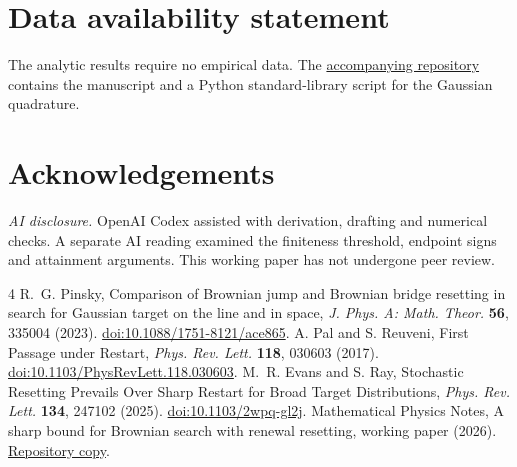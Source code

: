 \documentclass[11pt]{article}
\begin{document}
\section*{Data availability statement}
The analytic results require no empirical data. The
\href{https://github.com/daemonx666/math-physics-notes/tree/main/papers/gaussian-periodic-resetting}{accompanying repository}
contains the manuscript and a Python standard-library script for the
Gaussian quadrature.

\section*{Acknowledgements}
\emph{AI disclosure.} OpenAI Codex assisted with derivation, drafting and
numerical checks. A separate AI reading examined the finiteness threshold,
endpoint signs and attainment arguments. This working paper has not
undergone peer review.

\begin{thebibliography}{4}
 R.~G. Pinsky, Comparison of Brownian jump and Brownian
bridge resetting in search for Gaussian target on the line and in space,
\emph{J. Phys. A: Math. Theor.} \textbf{56}, 335004 (2023).
\href{https://doi.org/10.1088/1751-8121/ace865}{doi:10.1088/1751-8121/ace865}.
 A. Pal and S. Reuveni, First Passage under Restart,
\emph{Phys. Rev. Lett.} \textbf{118}, 030603 (2017).
\href{https://doi.org/10.1103/PhysRevLett.118.030603}{doi:10.1103/PhysRevLett.118.030603}.
 M.~R. Evans and S. Ray, Stochastic Resetting Prevails Over
Sharp Restart for Broad Target Distributions, \emph{Phys. Rev. Lett.}
\textbf{134}, 247102 (2025).
\href{https://doi.org/10.1103/2wpq-gl2j}{doi:10.1103/2wpq-gl2j}.
 Mathematical Physics Notes, A sharp bound for Brownian
search with renewal resetting, working paper (2026).
\href{https://github.com/daemonx666/math-physics-notes/blob/92bc9bc972a7755d4cc9ff2c768b29f5155a4621/papers/brownian-resetting/paper.pdf}{Repository copy}.
\end{thebibliography}
\end{document}

